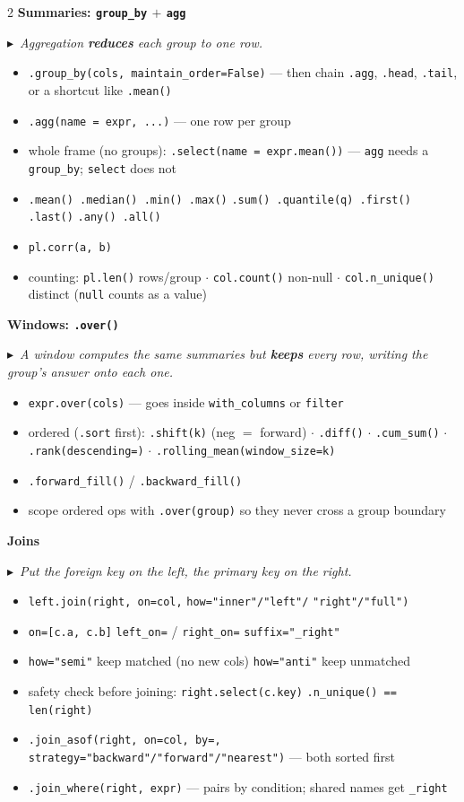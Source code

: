\documentclass[11pt, a4paper]{article}
\newcommand{\code}[1]{\textcolor{codecolor}{\texttt{#1}}}
\newcommand{\head}[1]{\smallskip\textbf{#1}\par\smallskip}
\newcommand{\key}[1]{\textcolor{keycolor}{$\blacktriangleright$~\textit{#1}}\par\smallskip}
\begin{document}
\begin{multicols}{2}
\head{Summaries: \code{group\_by} $+$ \code{agg}}
\key{Aggregation \textbf{reduces} each group to one row.}
\begin{itemize}
  \item \code{.group\_by(cols, maintain\_order=False)} --- then chain \code{.agg}, \code{.head}, \code{.tail}, or a shortcut like \code{.mean()}
  \item \code{.agg(name = expr, ...)} --- one row per group
  \item whole frame (no groups): \code{.select(name = expr.mean())} --- \code{agg} needs a \code{group\_by}; \code{select} does not
  \item \code{.mean() .median() .min() .max()} \code{.sum() .quantile(q) .first() .last()} \code{.any() .all()}
  \item \code{pl.corr(a, b)}
  \item counting: \code{pl.len()} rows/group $\cdot$ \code{col.count()} non-null $\cdot$ \code{col.n\_unique()} distinct (\code{null} counts as a value)
\end{itemize}

\head{Windows: \code{.over()}}
\key{A window computes the same summaries but \textbf{keeps} every row, writing the group's answer onto each one.}
\begin{itemize}
  \item \code{expr.over(cols)} --- goes inside \code{with\_columns} or \code{filter}
  \item ordered (\code{.sort} first): \code{.shift(k)} (neg $=$ forward) $\cdot$ \code{.diff()} $\cdot$ \code{.cum\_sum()} $\cdot$ \code{.rank(descending=)} $\cdot$ \code{.rolling\_mean(window\_size=k)}
  \item \code{.forward\_fill()} / \code{.backward\_fill()}
  \item scope ordered ops with \code{.over(group)} so they never cross a group boundary
\end{itemize}

\head{Joins}
\key{Put the foreign key on the left, the primary key on the right.}
\begin{itemize}
  \item \code{left.join(right, on=col,} \code{how="inner"/"left"/} \code{"right"/"full")}
  \item \code{on=[c.a, c.b]} \code{left\_on=} / \code{right\_on=} \code{suffix="\_right"}
  \item \code{how="semi"} keep matched (no new cols) \code{how="anti"} keep unmatched
  \item safety check before joining: \code{right.select(c.key)} \code{.n\_unique() == len(right)}
  \item \code{.join\_asof(right, on=col, by=,}\\
        \code{strategy="backward"/"forward"/"nearest")} --- both sorted first
  \item \code{.join\_where(right, expr)} --- pairs by condition; shared names get \code{\_right}
\end{itemize}


\end{multicols}
\end{document}
